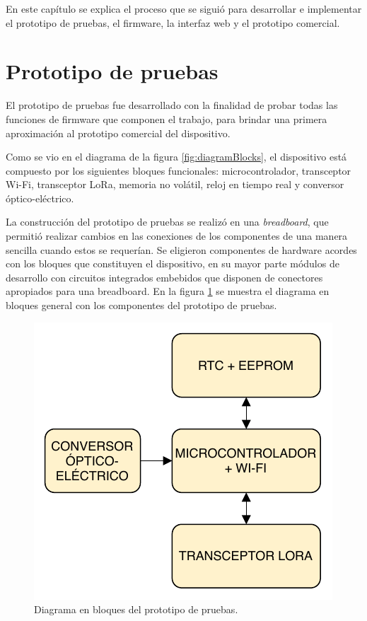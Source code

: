
En este capítulo se explica el proceso que se siguió para desarrollar e implementar el prototipo de pruebas, el firmware, la interfaz web y el prototipo comercial.


\section{Prototipo de pruebas}

El prototipo de pruebas fue desarrollado con la finalidad de probar todas las funciones de firmware que componen el trabajo, para brindar una primera aproximación al prototipo comercial del dispositivo.

Como se vio en el diagrama de la figura \ref{fig:diagramBlocks}, el dispositivo está compuesto por los siguientes bloques funcionales: microcontrolador, transceptor Wi-Fi, transceptor LoRa, memoria no volátil, reloj en tiempo real y conversor óptico-eléctrico.

La construcción del prototipo de pruebas se realizó en una \textit{breadboard}, que permitió realizar cambios en las conexiones de los componentes de una manera sencilla cuando estos se requerían. Se eligieron componentes de hardware acordes con los bloques que constituyen el dispositivo, en su mayor parte módulos de desarrollo con circuitos integrados embebidos que disponen de conectores apropiados para una breadboard. En la figura \ref{fig:blocksTest} se muestra el diagrama en bloques general con los componentes del prototipo de pruebas.

\begin{figure}[h]
	\centering
	\includegraphics[scale=1]{./Figures/test_blocks.pdf}
	\caption{Diagrama en bloques del prototipo de pruebas.}
	\label{fig:blocksTest}
\end{figure}

